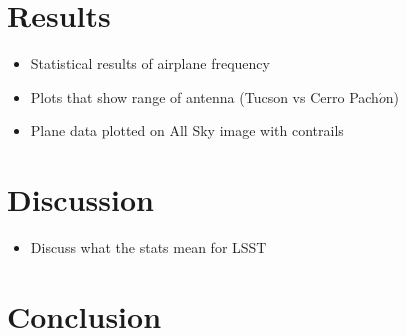 \documentclass[notitlepage, twocolumn]{revtex4}
\begin{document}
\section{Results}
\begin{itemize}
\item Statistical results of airplane frequency
\item Plots that show range of antenna (Tucson vs Cerro Pach$\acute{o}$n)
\item Plane data plotted on All Sky image with contrails
\end{itemize}
\section{Discussion}
\begin{itemize}
\item Discuss what the stats mean for LSST
\end{itemize}
\section{Conclusion}
\end{document}
